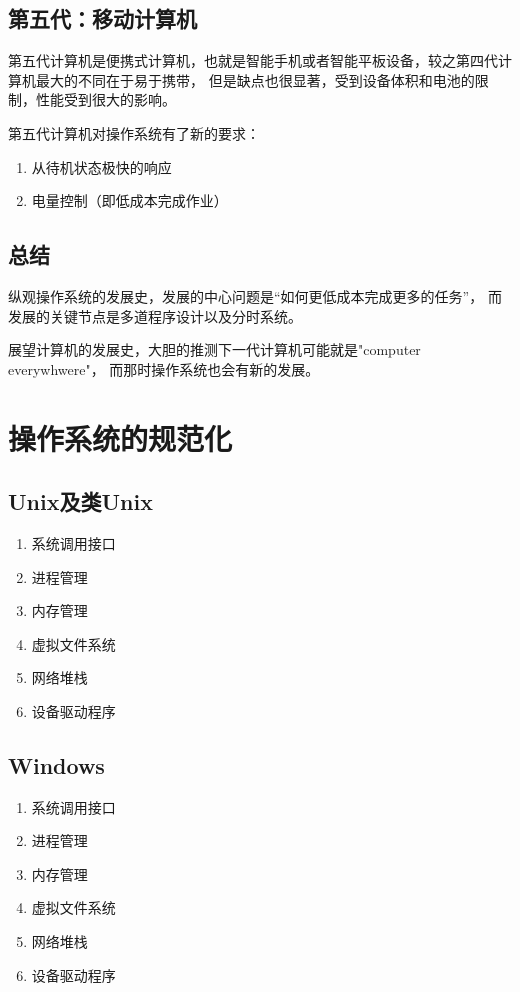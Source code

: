 
\subsection{第五代：移动计算机}

第五代计算机是便携式计算机，也就是智能手机或者智能平板设备，较之第四代计算机最大的不同在于易于携带，
但是缺点也很显著，受到设备体积和电池的限制，性能受到很大的影响。

第五代计算机对操作系统有了新的要求：
\begin{enumerate}
  \item 从待机状态极快的响应
  \item 电量控制（即低成本完成作业）
\end{enumerate}


\subsection{总结}

纵观操作系统的发展史，发展的中心问题是“如何更低成本完成更多的任务”，
而发展的关键节点是多道程序设计以及分时系统。

展望计算机的发展史，大胆的推测下一代计算机可能就是"computer everywhwere"，
而那时操作系统也会有新的发展。

\section{操作系统的规范化}

\subsection{Unix及类Unix}

\begin{enumerate}
  \item 系统调用接口
  \item 进程管理
  \item 内存管理
  \item 虚拟文件系统
  \item 网络堆栈
  \item 设备驱动程序
\end{enumerate}


\subsection{Windows}

\begin{enumerate}
  \item 系统调用接口
  \item 进程管理
  \item 内存管理
  \item 虚拟文件系统
  \item 网络堆栈
  \item 设备驱动程序
\end{enumerate}